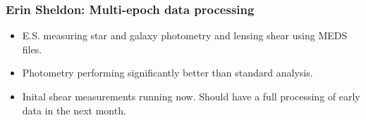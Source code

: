 \documentclass{beamer}
\begin{document}
\frame
{
    \frametitle{Erin Sheldon: Multi-epoch data processing}

    \begin{itemize}

        \item E.S. measuring star and galaxy photometry and 
            lensing shear using MEDS files.

        \item Photometry performing significantly better than
            standard analysis.

        \item Inital shear measurements running now.  Should have a full
            processing of early data in the next month.

    \end{itemize}
}
\end{document}
